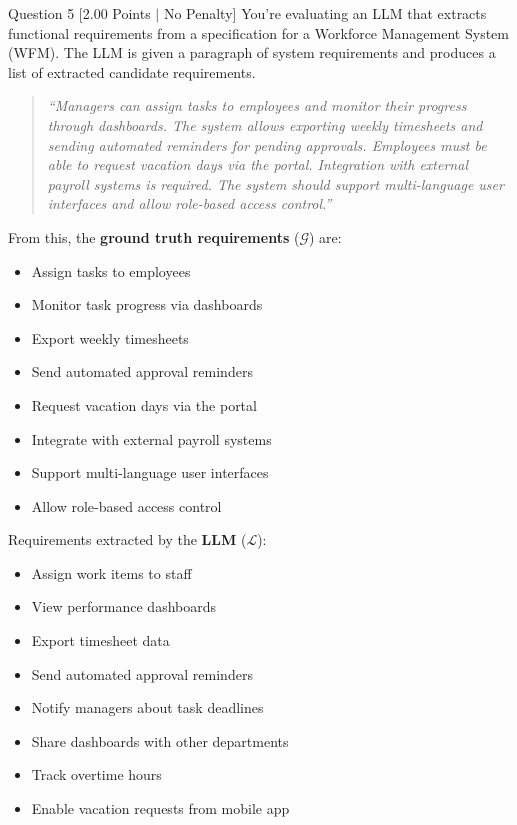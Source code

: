 \documentclass[11pt,a4paper]{article}
\begin{document}
\begin{questionbox}{Question 5 \hfill [2.00 Points $\vert$ No Penalty]}
You're evaluating an LLM that extracts functional requirements from a specification for a Workforce Management System (WFM). The LLM is given a paragraph of system requirements and produces a list of extracted candidate requirements.

\begin{quote}
\textit{“Managers can assign tasks to employees and monitor their progress through dashboards. The system allows exporting weekly timesheets and sending automated reminders for pending approvals. Employees must be able to request vacation days via the portal. Integration with external payroll systems is required. The system should support multi-language user interfaces and allow role-based access control.”}
\end{quote}

From this, the \textbf{ground truth requirements} ($\mathcal{G}$) are:
\begin{itemize}[leftmargin=2em]
    \item[\textbf{G1:}] Assign tasks to employees
    \item[\textbf{G2:}] Monitor task progress via dashboards
    \item[\textbf{G3:}] Export weekly timesheets
    \item[\textbf{G4:}] Send automated approval reminders
    \item[\textbf{G5:}] Request vacation days via the portal
    \item[\textbf{G6:}] Integrate with external payroll systems
    \item[\textbf{G7:}] Support multi-language user interfaces
    \item[\textbf{G8:}] Allow role-based access control
\end{itemize}

Requirements extracted by the \textbf{LLM} ($\mathcal{L}$):
\begin{itemize}[leftmargin=2em]
    \item[\textbf{L1:}] Assign work items to staff
    \item[\textbf{L2:}] View performance dashboards
    \item[\textbf{L3:}] Export timesheet data
    \item[\textbf{L4:}] Send automated approval reminders
    \item[\textbf{L5:}] Notify managers about task deadlines
    \item[\textbf{L6:}] Share dashboards with other departments
    \item[\textbf{L7:}] Track overtime hours
    \item[\textbf{L8:}] Enable vacation requests from mobile app
\end{itemize}


\end{questionbox}
\end{document}
